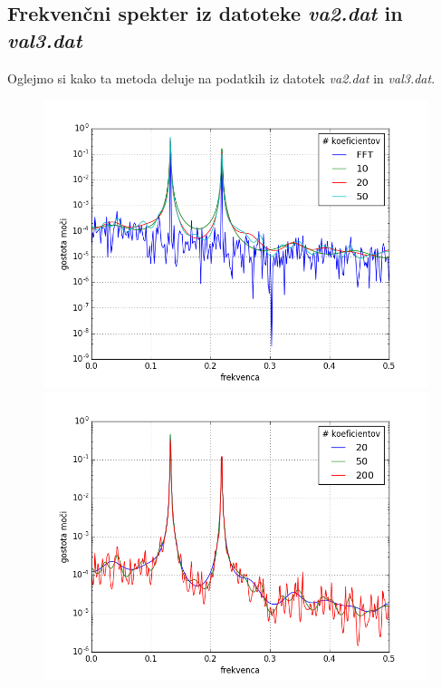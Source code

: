 \documentclass[slovene,11pt,a4paper]{article}
\numberwithin{equation}{section} %
\numberwithin{figure}{section} %
\numberwithin{table}{section} %
\begin{document}
\subsection{Frekvenčni spekter iz datoteke \textsl{va2.dat} in \textsl{val3.dat}}

Oglejmo si kako ta metoda deluje na podatkih iz datotek \textsl{va2.dat} in \textsl{val3.dat}.





\begin{figure}[!htb]
\centering
\begin{minipage}{0.5\textwidth}
\centering
\includegraphics[scale=0.45]{slike/val2_primerjava_fft.png}
\end{minipage}\hfill
\begin{minipage}{0.5\textwidth}
\centering
\includegraphics[scale=0.45]{slike/val2_primerjava_koef.png}
\end{minipage}


\end{figure}
\end{document}
